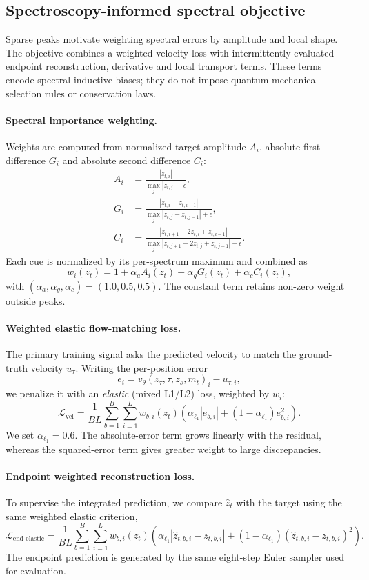 \documentclass[pdflatex,sn-mathphys-num]{sn-jnl}%
\theoremstyle{thmstyleone}%
\theoremstyle{thmstyletwo}%
\theoremstyle{thmstylethree}%
\begin{document}
\subsection*{Spectroscopy-informed spectral objective}

Sparse peaks motivate weighting spectral errors by amplitude and local shape. The objective combines a weighted velocity loss with intermittently evaluated endpoint reconstruction, derivative and local transport terms. These terms encode spectral inductive biases; they do not impose quantum-mechanical selection rules or conservation laws.

\paragraph{Spectral importance weighting.}
Weights are computed from normalized target amplitude $A_i$, absolute first difference $G_i$ and absolute second difference $C_i$:
\[
\begin{aligned}
A_i&=\frac{|z_{t,i}|}{\max_j |z_{t,j}|+\epsilon},\\
G_i&=\frac{|z_{t,i}-z_{t,i-1}|}
{\max_j |z_{t,j}-z_{t,j-1}|+\epsilon},\\
C_i&=\frac{|z_{t,i+1}-2z_{t,i}+z_{t,i-1}|}
{\max_j |z_{t,j+1}-2z_{t,j}+z_{t,j-1}|+\epsilon}.
\end{aligned}
\]
Each cue is normalized by its per-spectrum maximum and combined as
\[
w_i(z_t)
=
1+\alpha_a A_i(z_t)+\alpha_g G_i(z_t)+\alpha_c C_i(z_t),
\]
with $(\alpha_a,\alpha_g,\alpha_c)=(1.0,0.5,0.5)$. The constant term retains non-zero weight outside peaks.

\paragraph{Weighted elastic flow-matching loss.}
The primary training signal asks the predicted velocity to match the ground-truth velocity $u_\tau$. Writing the per-position error
\[
e_i = v_\theta(z_\tau,\tau,z_s,m_t)_i-u_{\tau,i},
\]
we penalize it with an \emph{elastic} (mixed L1/L2) loss, weighted by $w_i$:
\[
\mathcal{L}_{\mathrm{vel}}
=
\frac{1}{BL}
\sum_{b=1}^{B}\sum_{i=1}^{L}
w_{b,i}(z_t)
\left(
\alpha_{\ell_1}|e_{b,i}|
+
(1-\alpha_{\ell_1})e_{b,i}^{2}
\right).
\]
We set $\alpha_{\ell_1}=0.6$. The absolute-error term grows linearly with the residual, whereas the squared-error term gives greater weight to large discrepancies.

\paragraph{Endpoint weighted reconstruction loss.}
To supervise the integrated prediction, we compare $\hat z_t$ with the target using the same weighted elastic criterion,
\[
\mathcal{L}_{\mathrm{end\text{-}elastic}}
=
\frac{1}{BL}
\sum_{b=1}^{B}\sum_{i=1}^{L}
w_{b,i}(z_t)
\left(
\alpha_{\ell_1}|\hat{z}_{t,b,i}-z_{t,b,i}|
+
(1-\alpha_{\ell_1})(\hat{z}_{t,b,i}-z_{t,b,i})^2
\right).
\]
The endpoint prediction is generated by the same eight-step Euler sampler used for evaluation.
\end{document}
